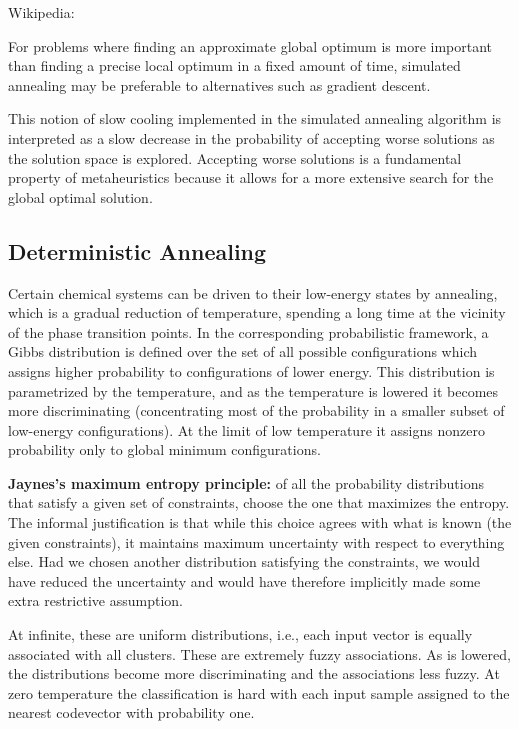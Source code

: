 \documentclass[12pt]{article}
\begin{document}
\par Wikipedia:
\ulb
\item For problems where finding an approximate global optimum is more important than finding a precise local optimum in a fixed amount of time, simulated annealing may be preferable to alternatives such as gradient descent.
\item This notion of slow cooling implemented in the simulated annealing algorithm is interpreted as a slow decrease in the probability of accepting worse solutions as the solution space is explored. Accepting worse solutions is a fundamental property of metaheuristics because it allows for a more extensive search for the global optimal solution.
\ule

\subsection{Deterministic Annealing}
\par Certain chemical systems can be driven to their low-energy states by annealing, which is a gradual reduction of temperature, spending a long time at the vicinity of the phase transition points. In the corresponding probabilistic framework, a Gibbs distribution is defined over the set of all possible configurations which assigns higher probability to configurations of lower energy. This distribution is parametrized by the temperature, and as the temperature is lowered it becomes more discriminating (concentrating most of the probability in a smaller subset of low-energy configurations). At the limit of low temperature it assigns nonzero probability only to global minimum configurations.
\par \textbf{Jaynes’s maximum entropy principle:} of all the probability distributions that satisfy a given set of constraints, choose the one that maximizes the entropy. The informal justification is that while this choice agrees with what is known (the given constraints), it maintains maximum uncertainty with respect to everything else. Had we chosen another distribution satisfying the constraints, we would have reduced the uncertainty and would have therefore implicitly made some extra restrictive assumption.
\par At infinite, these are uniform distributions, i.e., each input vector is equally associated with all clusters. These are extremely fuzzy associations. As is lowered, the distributions become more discriminating and the associations less fuzzy. At zero temperature the classification is hard with each input sample assigned to the nearest codevector with probability one.
\end{document}
